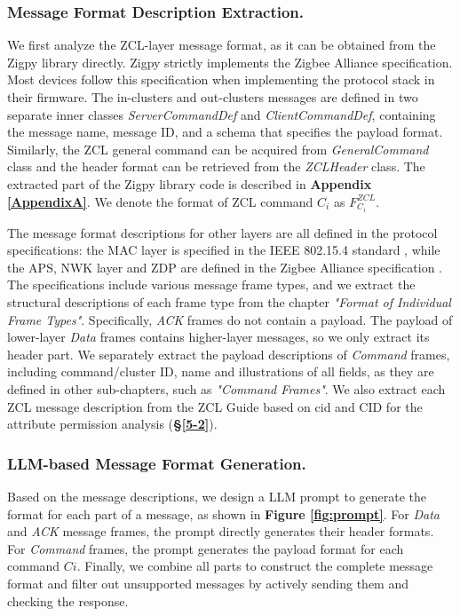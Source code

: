 \documentclass[10pt,journal,compsoc]{IEEEtran}
\begin{document}
\subsubsection{Message Format Description Extraction.} \label{4-1-2}
We first analyze the ZCL-layer message format, as it can be obtained from the Zigpy \cite{zigbeelibrary} library directly. Zigpy strictly implements the Zigbee Alliance specification. Most devices follow this specification when implementing the protocol stack in their firmware. The in-clusters and out-clusters messages are defined in two separate inner classes \textit{ServerCommandDef} and \textit{ClientCommandDef}, containing the message name, message ID, and a schema that specifies the payload format. Similarly, the ZCL general command can be acquired from \textit{GeneralCommand} class and the header format can be retrieved from the \textit{ZCLHeader} class. The extracted part of the Zigpy library code is described in \textbf{Appendix \ref{AppendixA}}. We denote the format of ZCL command $C_i$ as $F_{C_i}^{ZCL}$. 

The message format descriptions for other layers are all defined in the protocol specifications: the MAC layer is specified in the IEEE 802.15.4 standard \cite{mac}, while the APS, NWK layer and ZDP are defined in the Zigbee Alliance specification \cite{zigbeespecification}. The specifications include various message frame types, and we extract the structural descriptions of each frame type from the chapter \textit{"Format of Individual Frame Types"}. Specifically, \textit{ACK} frames do not contain a payload. The payload of lower-layer \textit{Data} frames contains higher-layer messages, so we only extract its header part. We separately extract the payload descriptions of \textit{Command} frames, including command/cluster ID, name and illustrations of all fields, as they are defined in other sub-chapters, such as \textit{"Command Frames"}. We also extract each ZCL message description from the ZCL Guide \cite{zcluserguide} based on cid and CID for the attribute permission analysis (\textbf{\S\ref{5-2}}).


\subsubsection{LLM-based Message Format Generation.} 
Based on the message descriptions, we design a LLM prompt to generate the format for each part of a message, as shown in \textbf{Figure \ref{fig:prompt}}. For \textit{Data} and \textit{ACK} message frames, the prompt directly generates their header formats. For \textit{Command} frames, the prompt generates the payload format for each command $Ci$. Finally, we combine all parts to construct the complete message format and filter out unsupported messages by actively sending them and checking the response.
\end{document}
